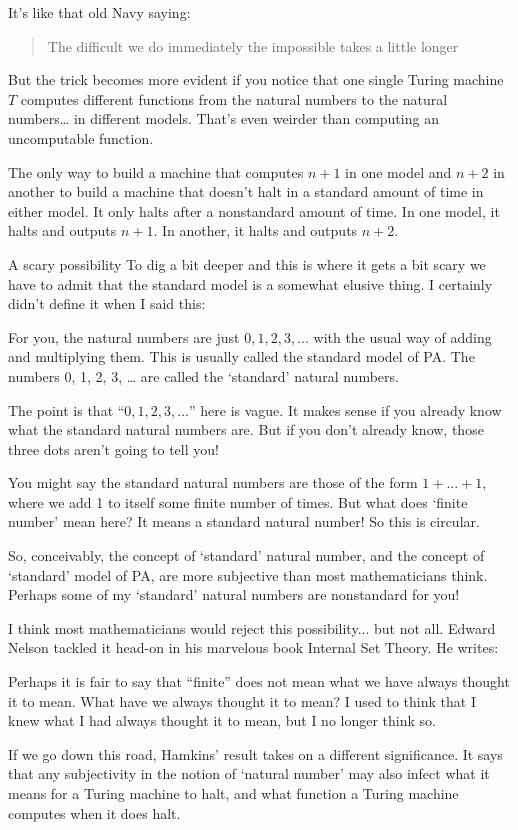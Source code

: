 \documentclass{article}
\begin{document}
It’s like that old Navy saying:

\blockquote{The difficult we do immediately the impossible takes a little longer}

But the trick becomes more evident if you notice that one single Turing machine $T$ computes different functions from the natural numbers to the natural numbers… in different models. That’s even weirder than computing an uncomputable function.

The only way to build a machine that computes $n+1$ in one model and $n+2$ in another to build a machine that doesn’t halt in a standard amount of time in either model. It only halts after a nonstandard amount of time. In one model, it halts and outputs $n+1$. In another, it halts and outputs $n+2$.

A scary possibility
To dig a bit deeper and this is where it gets a bit scary we have to admit that the standard model is a somewhat elusive thing. I certainly didn’t define it when I said this:

For you, the natural numbers are just $0, 1, 2, 3, ...$ with the usual way of adding and multiplying them. This is usually called the standard model of PA. The numbers 0, 1, 2, 3, … are called the ‘standard’ natural numbers.

The point is that “$0, 1, 2, 3, ...$” here is vague. It makes sense if you already know what the standard natural numbers are. But if you don’t already know, those three dots aren’t going to tell you!

You might say the standard natural numbers are those of the form $1 + ... + 1$, where we add 1 to itself some finite number of times. But what does ‘finite number’ mean here? It means a standard natural number! So this is circular.

So, conceivably, the concept of ‘standard’ natural number, and the concept of ‘standard’ model of PA, are more subjective than most mathematicians think. Perhaps some of my ‘standard’ natural numbers are nonstandard for you!

I think most mathematicians would reject this possibility... but not all. Edward Nelson tackled it head-on in his marvelous book Internal Set Theory. He writes:

Perhaps it is fair to say that “finite” does not mean what we have always thought it to mean. What have we always thought it to mean? I used to think that I knew what I had always thought it to mean, but I no longer think so.

If we go down this road, Hamkins’ result takes on a different significance. It says that any subjectivity in the notion of ‘natural number’ may also infect what it means for a Turing machine to halt, and what function a Turing machine computes when it does halt.
\end{document}
